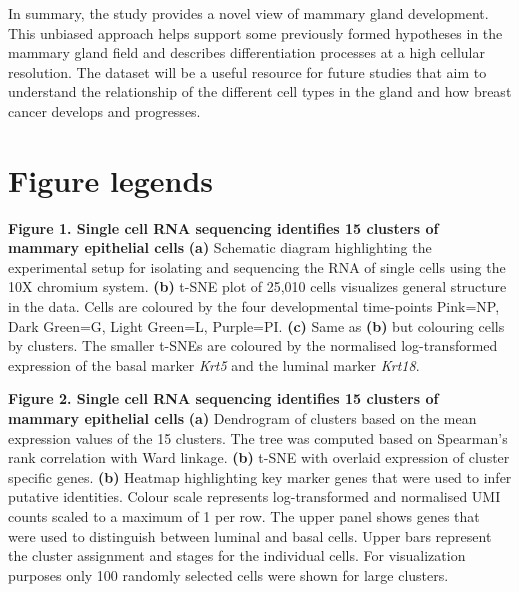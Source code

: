 \documentclass[titlepage, 12pt, oneside]{amsart}
\newcommand{\fakefigure}[1]%
{\refstepcounter{figure}\label{#1}}
\begin{document}
In summary, the study provides a novel view of mammary gland development.
This unbiased approach helps support some previously formed hypotheses in the mammary gland field and describes differentiation processes at a high cellular resolution.
The dataset will be a useful resource for future studies that aim to understand the relationship of the different cell types in the gland and how breast cancer develops and progresses.

\section{Figure legends}

\textbf{Figure 1. Single cell RNA sequencing identifies 15 clusters of mammary epithelial cells}
\fakefigure{F1}
\textbf{(a)} Schematic diagram highlighting the experimental setup for isolating and sequencing the RNA of single cells using the 10X chromium system.
\textbf{(b)} t-SNE plot of 25,010 cells visualizes general structure in the data.
Cells are coloured by the four developmental time-points Pink=NP, Dark Green=G, Light Green=L, Purple=PI.
\textbf{(c)} Same as \textbf{(b)} but colouring cells by clusters. The smaller t-SNEs are coloured by the normalised log-transformed expression of the basal marker \textit{Krt5} and the luminal marker \textit{Krt18}.


\textbf{Figure 2. Single cell RNA sequencing identifies 15 clusters of mammary epithelial cells}
\fakefigure{F2}
\textbf{(a)} Dendrogram of clusters based on the mean expression values of the 15 clusters. The tree was computed based on Spearman's rank correlation with Ward linkage.
\textbf{(b)} t-SNE with overlaid expression of cluster specific genes.
\textbf{(b)} Heatmap highlighting key marker genes that were used to infer putative identities.
Colour scale represents log-transformed and normalised UMI counts scaled to a maximum of 1 per row.
The upper panel shows genes that were used to distinguish between luminal and basal cells.
Upper bars represent the cluster assignment and stages for the individual cells.
For visualization purposes only 100 randomly selected cells were shown for large clusters.
\end{document}
